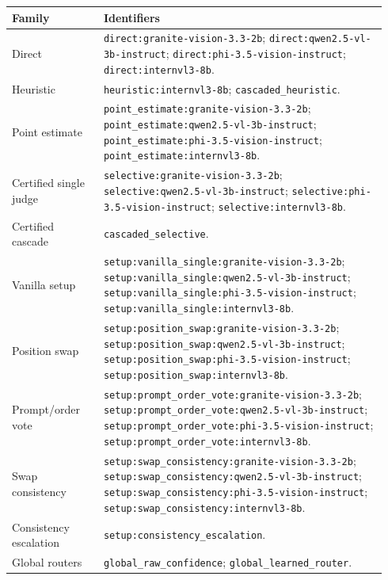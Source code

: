\documentclass[10pt]{article}
\DeclareRobustCommand{\method}[1]{\nolinkurl{#1}}
\begin{document}
\footnotesize
\begin{longtable}{@{}L{0.23\linewidth}L{0.71\linewidth}@{}}
\toprule
\textbf{Family} & \textbf{Identifiers} \\
\midrule
\endhead
Direct & \method{direct:granite-vision-3.3-2b}; \method{direct:qwen2.5-vl-3b-instruct}; \method{direct:phi-3.5-vision-instruct}; \method{direct:internvl3-8b}. \\
Heuristic & \method{heuristic:internvl3-8b}; \method{cascaded_heuristic}. \\
Point estimate & \method{point_estimate:granite-vision-3.3-2b}; \method{point_estimate:qwen2.5-vl-3b-instruct}; \method{point_estimate:phi-3.5-vision-instruct}; \method{point_estimate:internvl3-8b}. \\
Certified single judge & \method{selective:granite-vision-3.3-2b}; \method{selective:qwen2.5-vl-3b-instruct}; \method{selective:phi-3.5-vision-instruct}; \method{selective:internvl3-8b}. \\
Certified cascade & \method{cascaded_selective}. \\
Vanilla setup & \method{setup:vanilla_single:granite-vision-3.3-2b}; \method{setup:vanilla_single:qwen2.5-vl-3b-instruct}; \method{setup:vanilla_single:phi-3.5-vision-instruct}; \method{setup:vanilla_single:internvl3-8b}. \\
Position swap & \method{setup:position_swap:granite-vision-3.3-2b}; \method{setup:position_swap:qwen2.5-vl-3b-instruct}; \method{setup:position_swap:phi-3.5-vision-instruct}; \method{setup:position_swap:internvl3-8b}. \\
Prompt/order vote & \method{setup:prompt_order_vote:granite-vision-3.3-2b}; \method{setup:prompt_order_vote:qwen2.5-vl-3b-instruct}; \method{setup:prompt_order_vote:phi-3.5-vision-instruct}; \method{setup:prompt_order_vote:internvl3-8b}. \\
Swap consistency & \method{setup:swap_consistency:granite-vision-3.3-2b}; \method{setup:swap_consistency:qwen2.5-vl-3b-instruct}; \method{setup:swap_consistency:phi-3.5-vision-instruct}; \method{setup:swap_consistency:internvl3-8b}. \\
Consistency escalation & \method{setup:consistency_escalation}. \\
Global routers & \method{global_raw_confidence}; \method{global_learned_router}. \\
\bottomrule
\end{longtable}
\normalsize
\end{document}
